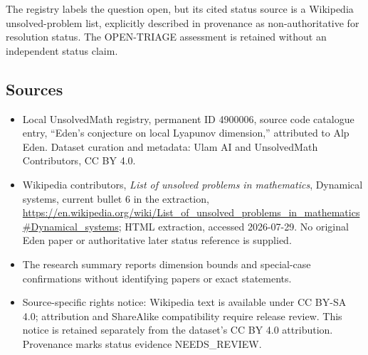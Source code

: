 \documentclass[11pt]{article}
\begin{document}
The registry labels the question open, but its cited status source is a Wikipedia unsolved-problem list, explicitly described in provenance as non-authoritative for resolution status. The OPEN-TRIAGE assessment is retained without an independent status claim.
\subsection{Sources}
\begin{itemize}
\item Local UnsolvedMath registry, permanent ID 4900006, source code catalogue entry, ``Eden's conjecture on local Lyapunov dimension,'' attributed to Alp Eden. Dataset curation and metadata: Ulam AI and UnsolvedMath Contributors, CC BY 4.0.
\item Wikipedia contributors, \emph{List of unsolved problems in mathematics}, Dynamical systems, current bullet 6 in the extraction, \url{https://en.wikipedia.org/wiki/List_of_unsolved_problems_in_mathematics#Dynamical_systems}; HTML extraction, accessed 2026-07-29. No original Eden paper or authoritative later status reference is supplied.
\item The research summary reports dimension bounds and special-case confirmations without identifying papers or exact statements.
\item Source-specific rights notice: Wikipedia text is available under CC BY-SA 4.0; attribution and ShareAlike compatibility require release review. This notice is retained separately from the dataset's CC BY 4.0 attribution. Provenance marks status evidence NEEDS\_REVIEW.
\end{itemize}
\end{document}
